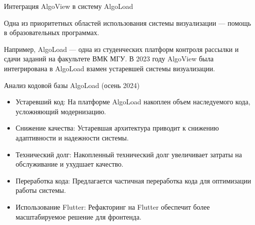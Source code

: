 \begin{frame}{Интеграция AlgoView в систему AlgoLoad}

Одна из приоритетных областей использования системы визуализации — помощь в образовательных программах. 

\vspace{5mm}

Например, AlgoLoad — одна из студенческих платформ контроля рассылки и сдачи заданий на факультете ВМК МГУ. В 2023 году AlgoView была интегрирована в AlgoLoad взамен устаревшей системы визуализации.



\end{frame}




\begin{frame}{Анализ кодовой базы AlgoLoad (осень 2024)}
\begin{itemize}
    \item Устаревший код: На платформе AlgoLoad накоплен объем наследуемого кода, усложняющий модернизацию.
    
    \item Снижение качества: Устаревшая архитектура приводит к снижению адаптивности и надежности системы.
    
    \item Технический долг: Накопленный технический долг увеличивает затраты на обслуживание и ухудшает качество.
    
    \item Переработка кода: Предлагается частичная переработка кода для оптимизации работы системы.
    
    \item Использование Flutter: Рефакторинг на Flutter обеспечит более масштабируемое решение для фронтенда.
    
\end{itemize}
\end{frame}









